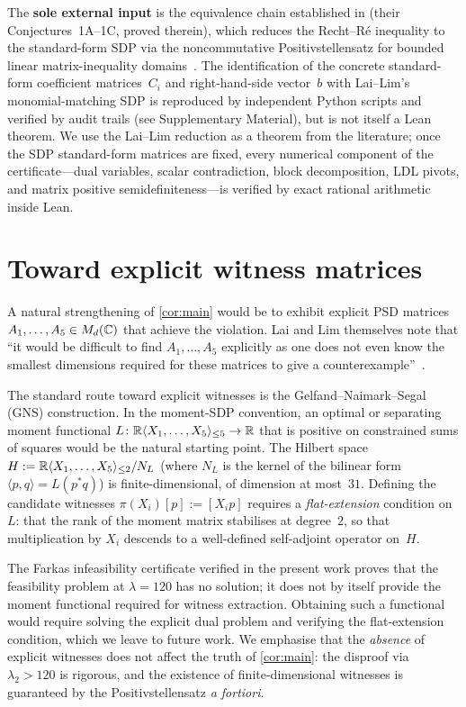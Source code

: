 The \textbf{sole external input} is the equivalence chain
established in \cite[\S\,3]{LaiLim2020} (their
Conjectures~1A--1C, proved therein), which reduces the
Recht--R\'e inequality to the standard-form SDP via the
noncommutative Positivstellensatz for bounded linear
matrix-inequality domains~\cite{Helton2002}.
The identification of the concrete standard-form coefficient
matrices~$C_i$ and right-hand-side vector~$b$ with Lai--Lim's
monomial-matching SDP is reproduced by independent Python scripts
and verified by audit trails (see Supplementary Material), but is
not itself a Lean theorem.
We use the Lai--Lim reduction as a theorem from the literature;
once the SDP standard-form matrices are fixed, every numerical
component of the certificate---dual variables, scalar
contradiction, block decomposition, LDL pivots, and matrix
positive semidefiniteness---is verified by exact rational
arithmetic inside Lean.

\section{Toward explicit witness matrices}\label{sec:witnesses}

A natural strengthening of \cref{cor:main} would be to exhibit
explicit PSD matrices $A_1,\dots,A_5\in M_d(\mathbb{C})$ that achieve the
violation.  Lai and Lim themselves note that ``it would be difficult
to find $A_1,\dots,A_5$ explicitly as one does not even know the
smallest dimensions required for these matrices to give a
counterexample''~\cite[\S\,3]{LaiLim2020}.

The standard route toward explicit witnesses is the
Gelfand--Naimark--Segal (GNS) construction.  In the moment-SDP
convention, an optimal or separating moment functional
$L\colon \mathbb{R}\langle X_1,\dots,X_5\rangle_{\le 5} \to \mathbb{R}$
that is positive on constrained sums of squares would be the
natural starting point.
The Hilbert space
$H := \mathbb{R}\langle X_1,\dots,X_5\rangle_{\le 2} / N_L$
(where $N_L$ is the kernel of the bilinear form
$\langle p,q\rangle = L(p^{*}q)$) is finite-dimensional, of dimension
at most~$31$.  Defining the candidate witnesses
$\pi(X_i)[p] := [X_i p]$ requires a \emph{flat-extension} condition
on~$L$: that the rank of the moment matrix stabilises at degree~$2$,
so that multiplication by $X_i$ descends to a well-defined
self-adjoint operator on~$H$.

The Farkas infeasibility certificate verified in the present
work proves that the feasibility problem at $\lambda=120$ has no
solution; it does not by itself provide the moment functional
required for witness extraction.  Obtaining such a functional
would require solving the explicit dual problem and verifying the
flat-extension condition, which we leave to future work.
We emphasise that the \emph{absence} of explicit witnesses does not
affect the truth of \cref{cor:main}: the disproof via
$\lambda_2 > 120$ is rigorous, and the existence of
finite-dimensional witnesses is guaranteed by the Positivstellensatz
\emph{a fortiori}.

